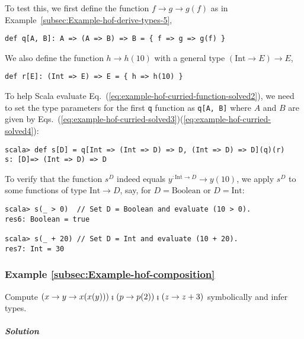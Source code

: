 To test this, we first define the function $f\rightarrow g\rightarrow g(f)$
as in Example~\ref{subsec:Example-hof-derive-types-5},
\begin{lstlisting}
def q[A, B]: A => (A => B) => B = { f => g => g(f) }
\end{lstlisting}
We also define the function $h\rightarrow h(10)$ with a general type
$\left(\text{Int}\rightarrow E\right)\rightarrow E$,
\begin{lstlisting}
def r[E]: (Int => E) => E = { h => h(10) }
\end{lstlisting}
To help Scala evaluate Eq.~(\ref{eq:example-hof-curried-function-solved2}),
we need to set the type parameters for the first \lstinline!q! function
as \lstinline!q[A, B]! where $A$ and $B$ are given by Eqs.~(\ref{eq:example-hof-curried-solved3})\textendash (\ref{eq:example-hof-curried-solved4}):
\begin{lstlisting}
scala> def s[D] = q[Int => (Int => D) => D, (Int => D) => D](q)(r)
s: [D]=> (Int => D) => D
\end{lstlisting}
To verify that the function $s^{D}$ indeed equals $y^{:\text{Int}\rightarrow D}\rightarrow y(10)$,
we apply $s^{D}$ to some functions of type $\text{Int}\rightarrow D$,
say, for $D=\text{Boolean}$ or $D=\text{Int}$:
\begin{lstlisting}
scala> s(_ > 0)  // Set D = Boolean and evaluate (10 > 0).
res6: Boolean = true

scala> s(_ + 20) // Set D = Int and evaluate (10 + 20).
res7: Int = 30
\end{lstlisting}


\subsubsection{Example \label{subsec:Example-hof-composition}\ref{subsec:Example-hof-composition}}

Compute $\left(x\rightarrow y\rightarrow x(x(y))\right)\bef\left(p\rightarrow p(2)\right)\bef\left(z\rightarrow z+3\right)$
symbolically and infer types.

\subparagraph{Solution}

